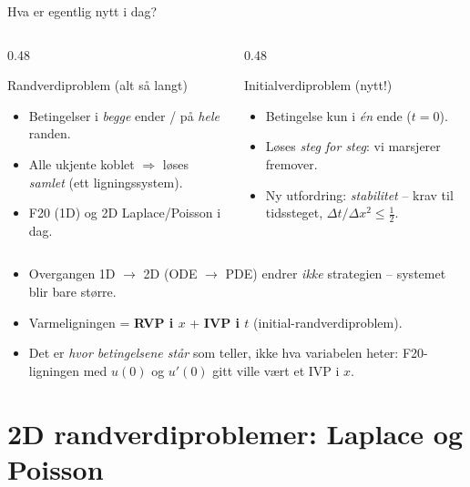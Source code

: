 \documentclass[11pt,aspectratio=169]{beamer}
\begin{document}
\begin{frame}{Hva er egentlig nytt i dag?}
\begin{columns}[T]
\begin{column}{0.48\textwidth}
\begin{defnb}{Randverdiproblem (alt så langt)}
\begin{itemize}
\item Betingelser i \emph{begge} ender / på \emph{hele} randen.
\item Alle ukjente koblet $\Rightarrow$ løses \emph{samlet} (ett ligningssystem).
\item F20 (1D) og 2D Laplace/Poisson i dag.
\end{itemize}
\end{defnb}
\end{column}
\begin{column}{0.48\textwidth}
\begin{defnb}{Initialverdiproblem (nytt!)}
\begin{itemize}
\item Betingelse kun i \emph{én} ende ($t=0$).
\item Løses \emph{steg for steg}: vi marsjerer fremover.
\item Ny utfordring: \emph{stabilitet} -- krav til tidssteget, $\Delta t/\Delta x^2\le\frac12$.
\end{itemize}
\end{defnb}
\end{column}
\end{columns}
\vspace{0.5em}
\begin{itemize}
\item Overgangen 1D $\to$ 2D (ODE $\to$ PDE) endrer \emph{ikke} strategien -- systemet blir bare større.
\item Varmeligningen = \textbf{RVP i $x$} + \textbf{IVP i $t$} (initial-randverdiproblem).
\item Det er \emph{hvor betingelsene står} som teller, ikke hva variabelen heter: F20-ligningen med $u(0)$ og $u'(0)$ gitt ville vært et IVP i $x$.
\end{itemize}
\end{frame}

\section{2D randverdiproblemer: Laplace og Poisson}
\end{document}
